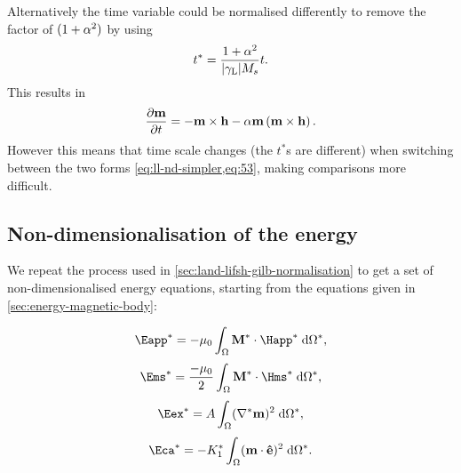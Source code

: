 Alternatively the time variable could be normalised differently to remove the factor of $(1 + \alpha^2)$ by using
\begin{equation}
  t^* = \frac{1 + \alpha^2}{{\left|{\gamma_{\mathrm{\tiny{L}}}} \right|} M_s} t.
\end{equation}
This results in
\begin{equation}
  \frac{\partial \boldsymbol{\mathrm{m}}}{\partial t} = -\boldsymbol{\mathrm{m}} \times \boldsymbol{\mathrm{h}} -\alpha \boldsymbol{\mathrm{m}} \left(\boldsymbol{\mathrm{m}} \times \boldsymbol{\mathrm{h}} \right).
  \label{eq:ll-nd-simpler}
\end{equation}
However this means that time scale changes (\ie the $t^*$s are different) when switching between the two forms \cref{eq:ll-nd-simpler,eq:53}, making comparisons more difficult.


\subsection{Non-dimensionalisation of the energy}
\label{sec:energy-calculations}

We repeat the process used in \cref{sec:land-lifsh-gilb-normalisation} to get a set of non-dimensionalised energy equations, starting from the equations given in \cref{sec:energy-magnetic-body}:

\begin{equation}
  \Eapp^* = - \mu_0 \int_{\magd} \Mv^* \cdot \Happ^* \d \magd^*,
\end{equation}
\begin{equation}
  \Ems^* =  \frac{-\mu_0}{2} \int_{\magd} \Mv^* \cdot \Hms^* \d \magd^*,
\end{equation}
\begin{equation}
  \Eex^* =  \Exchc \int_{\magd} (\grad^* \mv)^2 \d \magd^*,
\end{equation}
\begin{equation}
  \Eca^* =  -\Kone^* \int_\magd (\mv \cdot \ev)^2 \d \magd^*.
\end{equation}

